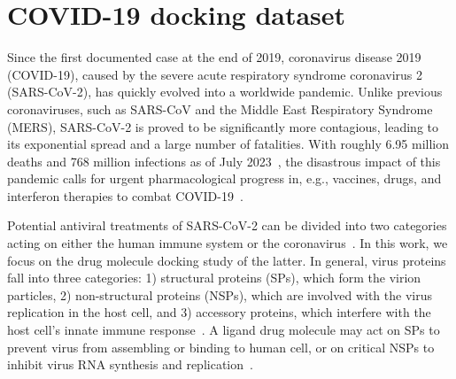 \documentclass[conference]{IEEEtran}
\begin{document}
\section{COVID-19 docking dataset}
Since the first documented case at the end of 2019, coronavirus disease 2019 (COVID-19), caused by the severe acute respiratory syndrome coronavirus 2 (SARS-CoV-2), has quickly evolved into a worldwide pandemic. Unlike previous coronaviruses, such as SARS-CoV and the Middle East Respiratory Syndrome (MERS), SARS-CoV-2 is proved to be significantly more contagious, leading to its exponential spread and a large number of fatalities. With roughly 6.95 million deaths and 768 million infections as of July 2023~\cite{who_covid}, the disastrous impact of this pandemic calls for urgent pharmacological progress in, e.g., vaccines, drugs, and interferon therapies to combat COVID-19~\cite{Ita2021Coronavirus}.

Potential antiviral treatments of SARS-CoV-2 can be divided into two categories acting on either the human immune system or the coronavirus~\cite{Wu2020analysis}. In this work, we focus on the drug molecule docking study of the latter. In general, virus proteins fall into three categories: 1) structural proteins (SPs), which form the virion particles, 2) non-structural proteins (NSPs), which are involved with the virus replication in the host cell, and 3) accessory proteins, which interfere with the host cell's innate immune response~\cite{mariano2020proteins}. A ligand drug molecule may act on SPs to prevent virus from assembling or binding to human cell, or on critical NSPs to inhibit virus RNA synthesis and replication~\cite{Wu2020analysis}.
\end{document}

